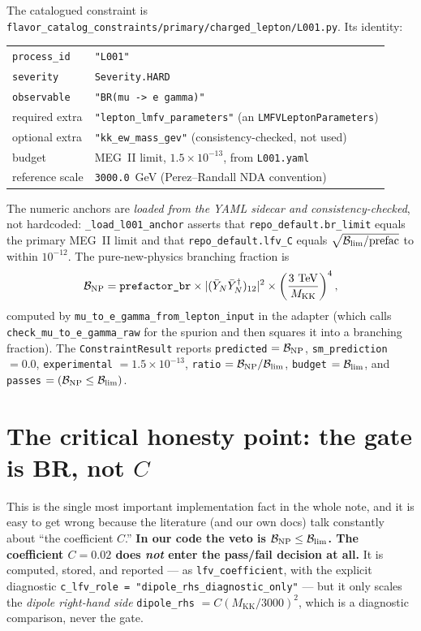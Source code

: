 \documentclass[11pt]{article}
\newcommand{\MKK}{M_{\mathrm{KK}}}
\newcommand{\YNb}{\bar Y_N}
\newcommand{\spur}{(\YNb\YNb^\dagger)_{12}}
\newcommand{\BR}{\mathcal{B}}
\newcommand{\code}[1]{\texttt{#1}}
\theoremstyle{definition}
\begin{document}
The catalogued constraint is
\code{flavor\_catalog\_constraints/primary/charged\_lepton/L001.py}. Its identity:
\begin{center}
\begin{tabular}{ll}
\toprule
\code{process\_id} & \code{"L001"} \\
\code{severity} & \code{Severity.HARD} \\
\code{observable} & \code{"BR(mu -> e gamma)"} \\
required extra & \code{"lepton\_lmfv\_parameters"} (an \code{LMFVLeptonParameters}) \\
optional extra & \code{"kk\_ew\_mass\_gev"} (consistency-checked, not used) \\
budget & MEG~II limit, $1.5\times10^{-13}$, from \code{L001.yaml} \\
reference scale & \code{3000.0}~GeV (Perez--Randall NDA convention) \\
\bottomrule
\end{tabular}
\end{center}
The numeric anchors are \emph{loaded from the YAML sidecar and
consistency-checked}, not hardcoded: \code{\_load\_l001\_anchor} asserts
that \code{repo\_default.br\_limit} equals the primary MEG~II limit and that
\code{repo\_default.lfv\_C} equals $\sqrt{\BR_{\rm lim}/\text{prefac}}$ to within
$10^{-12}$. The pure-new-physics branching fraction is
\begin{equation}
\BR_{\rm NP} = \code{prefactor\_br}\times|\spur|^2\times
   \left(\frac{3\ \mathrm{TeV}}{\MKK}\right)^4,
\label{eq:codeBR}
\end{equation}
computed by \code{mu\_to\_e\_gamma\_from\_lepton\_input} in the adapter (which
calls \code{check\_mu\_to\_e\_gamma\_raw} for the spurion and then squares it into
a branching fraction). The \code{ConstraintResult} reports
\code{predicted} $=\BR_{\rm NP}$, \code{sm\_prediction} $=0.0$,
\code{experimental} $=1.5\times10^{-13}$, \code{ratio} $=\BR_{\rm NP}/\BR_{\rm lim}$,
\code{budget} $=\BR_{\rm lim}$, and \code{passes} $=(\BR_{\rm NP}\le\BR_{\rm lim})$.

\section{The critical honesty point: the gate is BR, not $C$}
\label{sec:honesty}

This is the single most important implementation fact in the whole note, and it
is easy to get wrong because the literature (and our own docs) talk constantly
about ``the coefficient $C$.'' \textbf{In our code the veto is
$\BR_{\rm NP}\le\BR_{\rm lim}$. The coefficient $C=0.02$ does \emph{not} enter the
pass/fail decision at all.} It is computed, stored, and reported --- as
\code{lfv\_coefficient}, with the explicit diagnostic
\code{c\_lfv\_role = "dipole\_rhs\_diagnostic\_only"} --- but it only scales the
\emph{dipole right-hand side} \code{dipole\_rhs} $=C(\MKK/3000)^2$, which is a
diagnostic comparison, never the gate.
\end{document}
